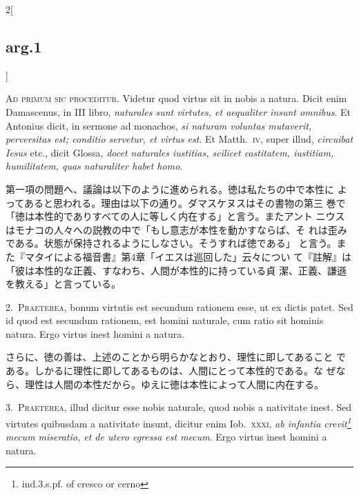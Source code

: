 \documentclass[paper=a4paper,fontsize=10pt,jafontsize=9pt,titlepage]{jlreq}
\begin{document}
\begin{paracol}{2}[\subsection{arg.1}]

{\scshape Ad primum sic proceditur}. Videtur quod virtus sit in nobis
a natura. Dicit enim Damascenus, in III libro, {\itshape naturales
sunt virtutes, et aequaliter insunt omnibus}. Et Antonius dicit, in
sermone ad monachos, {\itshape si naturam voluntas mutaverit,
perversitas est; conditio servetur, et virtus est}. Et
Matth.~{\scshape iv}, super illud, {\itshape circuibat Iesus} etc.,
dicit Glossa, {\itshape docet naturales iustitias, scilicet
castitatem, iustitiam, humilitatem, quas naturaliter habet homo}.

\switchcolumn

第一項の問題へ、議論は以下のように進められる。徳は私たちの中で本性に
 よってあると思われる。理由は以下の通り。ダマスケヌスはその書物の第三
 巻で「徳は本性的でありすべての人に等しく内在する」と言う。またアント
 ニウスはモナコの人々への説教の中で「もし意志が本性を動かすならば、そ
 れは歪みである。状態が保持されるようにしなさい。そうすれば徳である」
 と言う。また『マタイによる福音書』第4章「イエスは巡回した」云々につい
 て『註解』は「彼は本性的な正義、すなわち、人間が本性的に持っている貞
 潔、正義、謙遜を教える」と言っている。


2.~{\scshape Praeterea}, bonum virtutis est secundum rationem esse, ut
ex dictis patet. Sed id quod est secundum rationem, est homini
naturale, cum ratio sit hominis natura. Ergo virtus inest homini a
natura.

\switchcolumn

さらに、徳の善は、上述のことから明らかなとおり、理性に即してあること
 である。しかるに理性に即してあるものは、人間にとって本性的である。な
 ぜなら、理性は人間の本性だから。ゆえに徳は本性によって人間に内在する。


3.~{\scshape Praeterea}, illud dicitur esse nobis naturale, quod nobis
a nativitate inest. Sed virtutes quibusdam a nativitate insunt,
dicitur enim Iob.~{\scshape xxxi}, {\itshape ab infantia
crevit\footnote{ind.3.s.pf. of cresco or cerno} mecum miseratio, et de
utero egressa est mecum}. Ergo virtus inest homini a natura.


\end{paracol}
\end{document}
